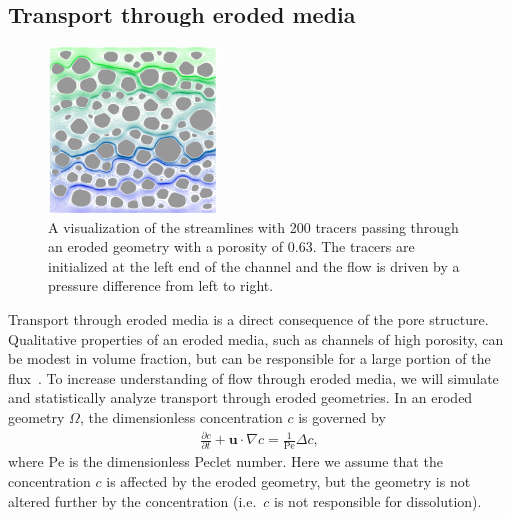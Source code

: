 \documentclass[11pt]{article}
\newcommand{\pd}[2]{ \frac{ \partial #1}{ \partial #2 } }
\newcommand{\bvec}[1]{{\mathbf{#1}}}
\newcommand{\Pe}{\mathrm{Pe}}
\newcommand{\uu}{\bvec{u}}
\begin{document}
\subsection{Transport through eroded media}

\begin{figure}
  \includegraphics[width=0.4\textwidth]{figs/100b_t100tracer}
  \caption{\label{fig:100tracers} A visualization of the streamlines
  with 200 tracers passing through an eroded geometry with a porosity of
  0.63. The tracers are initialized at the left end of the channel and
  the flow is driven by a pressure difference from left to right.}
\end{figure}

Transport through eroded media is a direct consequence of the pore structure. Qualitative properties of an eroded media, such as channels of high porosity, can be modest in volume fraction, but can be responsible for a large portion of the flux~\cite{Quaife2018}.  To increase understanding of flow through eroded media, we will simulate and statistically analyze transport through eroded geometries. In an eroded geometry $\Omega$, the dimensionless concentration $c$ is governed by
\begin{align}
  \pd{c}{t} + \uu \cdot \nabla c = \frac{1}{\Pe} \Delta c, 
  \label{eqn:advectionDiffusion}
\end{align}
where $\Pe$ is the dimensionless Peclet number. Here we assume that the concentration $c$ is affected by the eroded geometry, but the geometry is not altered further by the concentration (i.e.~$c$ is not responsible for dissolution).  
\end{document}
